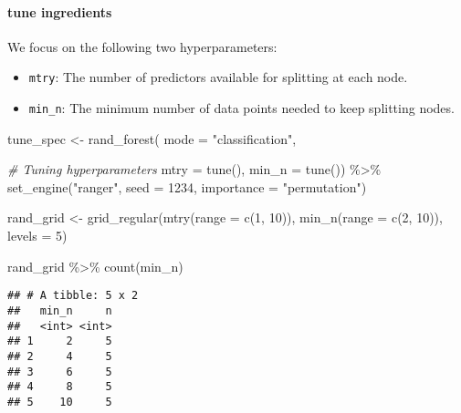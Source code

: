 \documentclass[
]{book}
\newenvironment{Shaded}{\begin{snugshade}}{\end{snugshade}}
\newcommand{\AttributeTok}[1]{\textcolor[rgb]{0.77,0.63,0.00}{#1}}
\newcommand{\CommentTok}[1]{\textcolor[rgb]{0.56,0.35,0.01}{\textit{#1}}}
\newcommand{\DecValTok}[1]{\textcolor[rgb]{0.00,0.00,0.81}{#1}}
\newcommand{\FunctionTok}[1]{\textcolor[rgb]{0.00,0.00,0.00}{#1}}
\newcommand{\NormalTok}[1]{#1}
\newcommand{\OtherTok}[1]{\textcolor[rgb]{0.56,0.35,0.01}{#1}}
\newcommand{\SpecialCharTok}[1]{\textcolor[rgb]{0.00,0.00,0.00}{#1}}
\newcommand{\StringTok}[1]{\textcolor[rgb]{0.31,0.60,0.02}{#1}}
\begin{document}
\hypertarget{tune-ingredients-2}{%
\paragraph{tune ingredients}\label{tune-ingredients-2}}

We focus on the following two hyperparameters:

\begin{itemize}
\item
  \texttt{mtry}: The number of predictors available for splitting at each node.
\item
  \texttt{min\_n}: The minimum number of data points needed to keep splitting nodes.
\end{itemize}

\begin{Shaded}
\begin{Highlighting}[]
\NormalTok{tune\_spec }\OtherTok{\textless{}{-}} 
  \FunctionTok{rand\_forest}\NormalTok{(}
           \AttributeTok{mode =} \StringTok{"classification"}\NormalTok{,}
           
           \CommentTok{\# Tuning hyperparameters}
           \AttributeTok{mtry =} \FunctionTok{tune}\NormalTok{(), }
           \AttributeTok{min\_n =} \FunctionTok{tune}\NormalTok{()) }\SpecialCharTok{\%\textgreater{}\%}
  \FunctionTok{set\_engine}\NormalTok{(}\StringTok{"ranger"}\NormalTok{,}
             \AttributeTok{seed =} \DecValTok{1234}\NormalTok{, }
             \AttributeTok{importance =} \StringTok{"permutation"}\NormalTok{)}

\NormalTok{rand\_grid }\OtherTok{\textless{}{-}} \FunctionTok{grid\_regular}\NormalTok{(}\FunctionTok{mtry}\NormalTok{(}\AttributeTok{range =} \FunctionTok{c}\NormalTok{(}\DecValTok{1}\NormalTok{, }\DecValTok{10}\NormalTok{)),}
                          \FunctionTok{min\_n}\NormalTok{(}\AttributeTok{range =} \FunctionTok{c}\NormalTok{(}\DecValTok{2}\NormalTok{, }\DecValTok{10}\NormalTok{)),}
                          \AttributeTok{levels =} \DecValTok{5}\NormalTok{)}

\NormalTok{rand\_grid }\SpecialCharTok{\%\textgreater{}\%}
  \FunctionTok{count}\NormalTok{(min\_n)}
\end{Highlighting}
\end{Shaded}

\begin{verbatim}
## # A tibble: 5 x 2
##   min_n     n
##   <int> <int>
## 1     2     5
## 2     4     5
## 3     6     5
## 4     8     5
## 5    10     5
\end{verbatim}
\end{document}
